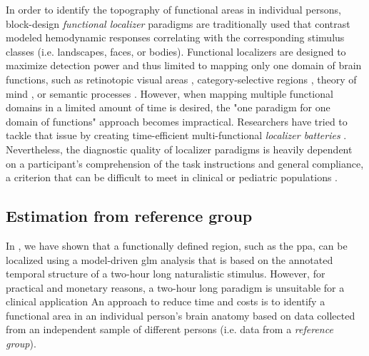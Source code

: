 In order to identify the topography of functional areas in individual persons,
block-design \textit{functional localizer} paradigms are traditionally used that
contrast modeled hemodynamic responses correlating with the corresponding
stimulus classes (i.e. landscapes, faces, or bodies).
Functional localizers are designed to maximize detection power and thus limited
to mapping only one domain of brain functions, such as retinotopic visual areas
\citep{wang2015probabilistic}, category-selective regions
\citep{stigliani2015temporal}, theory of mind \citep{spunt2014validating}, or
semantic processes \citep{fedorenko2010new, fernandez2001language}.
However, when mapping multiple functional domains in a limited amount of time is
desired, the "one paradigm for one domain of functions" approach becomes
impractical.
Researchers have tried to tackle that issue by creating time-efficient
multi-functional \textit{localizer batteries} \citep[e.g.,][]{barch2013function,
drobyshevsky2006rapid, pinel2007fast}.
Nevertheless, the diagnostic quality of localizer paradigms is heavily dependent
on a participant's comprehension of the task instructions and general
compliance, a criterion that can be difficult to meet in clinical or pediatric
populations \citep{eickhoff2020towards, vanderwal2019movies}.


\subsection{Estimation from reference group}


In \citet{haeusler2022processing}, we have shown that a functionally defined
region, such as the \ac{ppa}, can be localized using a model-driven \ac{glm}
analysis that is based on the annotated temporal structure of a two-hour long
naturalistic stimulus.
However, for practical and monetary reasons, a two-hour long paradigm is
unsuitable for a clinical application
An approach to reduce time and costs is to identify a functional area in an
individual person's brain anatomy based on data collected from an independent
sample of different persons (i.e. data from a \textit{reference group}).



